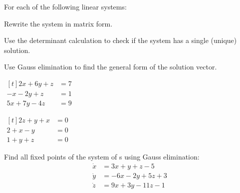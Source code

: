       \begin{question}
      For each of the following linear systems:
      \begin{compactenum}[(i)]
      \item Rewrite the system in matrix form.
      \item Use the determinant calculation to check if the system has a single (unique) solution. 
      \item Use Gauss elimination to find the general form of the solution vector.
      \end{compactenum}

      \begin{colenumerate}
      \item\( \begin{aligned}[t]
      2x + 6y + z  &= 7\\
      -x - 2y + z   &= 1\\
      5x + 7y - 4z &= 9
            \end{aligned}\)
          \item\( \begin{aligned}[t]
      2z + y + x  &= 0\\
      2 + x - y   &= 0\\
      1 + y + z   &= 0
            \end{aligned} \)
      \end{colenumerate}
      \end{question}

      \begin{question}
      Find all fixed points of the system of \ode{}s using Gauss elimination:
      \begin{align*}
        \dot x &= 3x + y + z - 5 \\
        \dot y &= -6x -2y + 5z + 3 \\
        \dot z &= 9x + 3y -11z -1
      \end{align*}
      \end{question}


